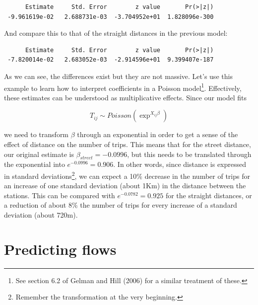 \documentclass[
  letterpaper,
  DIV=11,
  numbers=noendperiod,
  oneside]{scrreprt}
\newenvironment{Shaded}{\begin{snugshade}}{\end{snugshade}}
\newcommand{\FunctionTok}[1]{\textcolor[rgb]{0.28,0.35,0.67}{#1}}
\newcommand{\NormalTok}[1]{\textcolor[rgb]{0.00,0.23,0.31}{#1}}
\newcommand{\SpecialCharTok}[1]{\textcolor[rgb]{0.37,0.37,0.37}{#1}}
\newcommand{\StringTok}[1]{\textcolor[rgb]{0.13,0.47,0.30}{#1}}
\begin{document}
\begin{verbatim}
      Estimate     Std. Error        z value       Pr(>|z|) 
 -9.961619e-02   2.688731e-03  -3.704952e+01  1.828096e-300 
\end{verbatim}

And compare this to that of the straight distances in the previous
model:

\begin{Shaded}
\end{Shaded}

\begin{verbatim}
      Estimate     Std. Error        z value       Pr(>|z|) 
 -7.820014e-02   2.683052e-03  -2.914596e+01  9.399407e-187 
\end{verbatim}

As we can see, the differences exist but they are not massive. Let's use
this example to learn how to interpret coefficients in a Poisson
model\footnote{See section 6.2 of Gelman and Hill (2006) for a similar
  treatment of these.}. Effectively, these estimates can be understood
as multiplicative effects. Since our model fits

\[
T_{ij} \sim Poisson (\exp^{X_{ij}\beta})
\]

we need to transform \(\beta\) through an exponential in order to get a
sense of the effect of distance on the number of trips. This means that
for the street distance, our original estimate is
\(\beta_{street} = -0.0996\), but this needs to be translated through
the exponential into \(e^{-0.0996} = 0.906\). In other words, since
distance is expressed in standard deviations\footnote{Remember the
  transformation at the very beginning.}, we can expect a 10\% decrease
in the number of trips for an increase of one standard deviation (about
1Km) in the distance between the stations. This can be compared with
\(e^{-0.0782} = 0.925\) for the straight distances, or a reduction of
about 8\% the number of trips for every increase of a standard deviation
(about 720m).

\section{Predicting flows}\label{predicting-flows}
\end{document}
